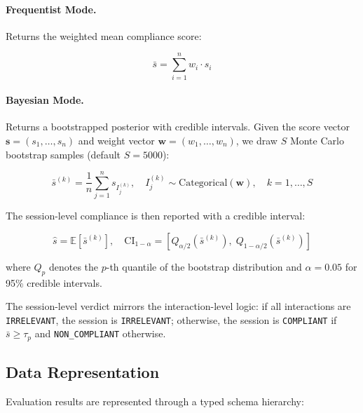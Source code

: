 \paragraph{Frequentist Mode.} Returns the weighted mean compliance score:

\begin{equation}
    \bar{s} = \sum_{i=1}^{n} w_i \cdot s_i
\end{equation}

\paragraph{Bayesian Mode.} Returns a bootstrapped posterior with credible intervals. Given the score vector $\mathbf{s} = (s_1, \ldots, s_n)$ and weight vector $\mathbf{w} = (w_1, \ldots, w_n)$, we draw $S$ Monte Carlo bootstrap samples (default $S = 5000$):

\begin{equation}
    \bar{s}^{(k)} = \frac{1}{n} \sum_{j=1}^{n} s_{I_j^{(k)}}, \quad I_j^{(k)} \sim \text{Categorical}(\mathbf{w}), \quad k = 1, \ldots, S
\end{equation}

The session-level compliance is then reported with a credible interval:

\begin{equation}
    \hat{s} = \mathbb{E}[\bar{s}^{(k)}], \quad \text{CI}_{1-\alpha} = \left[ Q_{\alpha/2}(\bar{s}^{(k)}), \; Q_{1-\alpha/2}(\bar{s}^{(k)}) \right]
\end{equation}

where $Q_p$ denotes the $p$-th quantile of the bootstrap distribution and $\alpha = 0.05$ for 95\% credible intervals.

The session-level verdict mirrors the interaction-level logic: if all interactions are \texttt{IRRELEVANT}, the session is \texttt{IRRELEVANT}; otherwise, the session is \texttt{COMPLIANT} if $\bar{s} \geq \tau_p$ and \texttt{NON\_COMPLIANT} otherwise.

\subsection{Data Representation}

Evaluation results are represented through a typed schema hierarchy:

